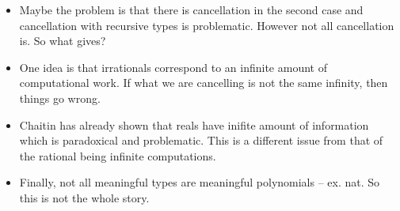 \documentclass[preprint]{sigplanconf}
\begin{document}
\begin{itemize}
\item Maybe the problem is that there is cancellation in the second
  case and cancellation with recursive types is problematic. However
  not all cancellation is. So what gives?

\item One idea is that irrationals correspond to an infinite amount of
  computational work. If what we are cancelling is not the same
  infinity, then things go wrong. 

\item Chaitin has already shown that reals have inifite amount of
  information which is paradoxical and problematic. This is a
  different issue from that of the rational being infinite
  computations.

\item Finally, not all meaningful types are meaningful polynomials --
  ex. nat. So this is not the whole story. 

\end{itemize}




\end{document}
